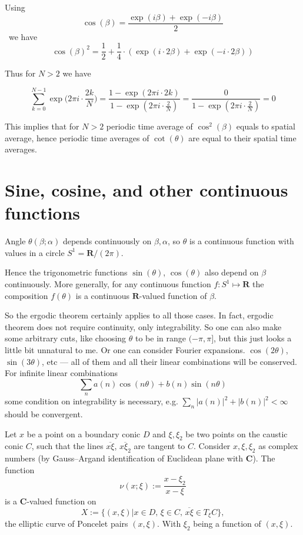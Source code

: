 \documentclass[12pt]{article}
\numberwithin{equation}{section}
\renewcommand\C{\mathbf{C}}                  %
\newcommand\R{\mathbf{R}}                    %
\begin{document}
Using
\[      \cos(β) = \frac{\exp(iβ) + \exp(-iβ)}2 \]
 we have
\[      \cos(β)^2 = \frac12 + \frac14\cdot{(\exp(i\cdot2β) + \exp(-i\cdot2β))} \]


Thus for $N>2$ we have

\[ \sum_{k=0}^{N-1} \exp\big(2πi\cdot \frac{2k}{N}\big) 
= \frac{1-\exp(2πi\cdot 2k)}{1-\exp(2πi\cdot\frac{2}{N})} 
= \frac0{1-\exp(2πi\cdot\frac{2}{N})} = 0 \]


This implies that for $N>2$ periodic time average of $\cos^2(β)$ equals to spatial average,
hence periodic time averages of $\cot(θ)$ are equal to their spatial time averages.

\section{Sine, cosine, and other continuous functions}

Angle $θ(β;α)$ depends continuously on $β,α$,
so $θ$ is a continuous function with values in a circle $S^1 = \R/(2π)$.


Hence the trigonometric functions $\sin(θ)$, $\cos(θ)$ also depend on $β$ continuously.
More generally, for any continuous function $f : S^1 \mapsto \R$
the composition $f(θ)$ is a continuous $\R$-valued function of $β$.

So the ergodic theorem certainly applies to all those cases.
In fact, ergodic theorem does not require continuity, only integrability.
So one can also make some arbitrary cuts, 
like choosing $θ$ to be in range $(-π,π]$, 
but this just looks a little bit unnatural to me.
Or one can consider Fourier expansions.
 $\cos(2θ)$, $\sin(3θ)$, etc --- 
all of them and all their linear combinations will be conserved.
For infinite linear combinations 
\[ \sum_n a(n) \cos(nθ) + b(n) \sin(nθ) \]
some condition on integrability is necessary,
 e.g. $\sum_n |a(n)|^2 + |b(n)|^2 < \infty$ 
should be convergent.


Let $x$ be a point on a boundary conic $D$ 
and $ξ,ξ_2$ be two points on the caustic conic $C$,
such that the lines $\overline{xξ}$, $\overline{xξ_2}$ are tangent to $C$.
Consider $x,ξ,ξ_2$ as complex numbers (by Gauss--Argand identification of Euclidean plane with $\C$).
The function
\[     ν(x;ξ) := \frac{x-ξ_2}{x-ξ} \]
is a $\C$-valued function on
\[ X := \{(x,ξ) | x\in D,\,ξ\in C,\,\overline{xξ}\in T_ξ C\}, \]
the elliptic curve of Poncelet pairs $(x,ξ)$.
With $ξ_2$ being a function of $(x,ξ)$.
\end{document}
